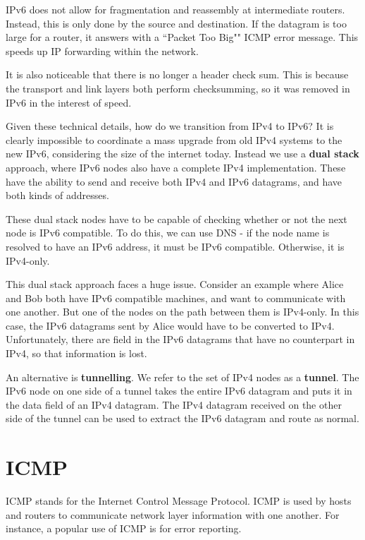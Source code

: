 \documentclass[12pt,letterpaper]{book}
\theoremstyle{definition}
\begin{document}
IPv6 does not allow for fragmentation and reassembly at intermediate routers. Instead, this is only done by the source and destination. If the datagram is too large for a router, it answers with a ``Packet Too Big"" ICMP error message. This speeds up IP forwarding within the network.

It is also noticeable that there is no longer a header check sum. This is because the transport and link layers both perform checksumming, so it was removed in IPv6 in the interest of speed.

Given these technical details, how do we transition from IPv4 to IPv6? It is clearly impossible to coordinate a mass upgrade from old IPv4 systems to the new IPv6, considering the size of the internet today. Instead we use a \textbf{dual stack} approach, where IPv6 nodes also have a complete IPv4 implementation. These have the ability to send and receive both IPv4 and IPv6 datagrams, and have both kinds of addresses. 

These dual stack nodes have to be capable of checking whether or not the next node is IPv6 compatible. To do this, we can use DNS - if the node name is resolved to have an IPv6 address, it must be IPv6 compatible. Otherwise, it is IPv4-only.

This dual stack approach faces a huge issue. Consider an example where Alice and Bob both have IPv6 compatible machines, and want to communicate with one another. But one of the nodes on the path between them is IPv4-only. In this case, the IPv6 datagrams sent by Alice would have to be converted to IPv4. Unfortunately, there are field in the IPv6 datagrams that have no counterpart in IPv4, so that information is lost.

An alternative is \textbf{tunnelling}. We refer to the set of IPv4 nodes as a \textbf{tunnel}. The IPv6 node on one side of a tunnel takes the entire IPv6 datagram and puts it in the data field of an IPv4 datagram. The IPv4 datagram received on the other side of the tunnel can be used to extract the IPv6 datagram and route as normal.

\section{ICMP}

ICMP stands for the Internet Control Message Protocol. ICMP is used by hosts and routers to communicate network layer information with one another. For instance, a popular use of ICMP is for error reporting.
\end{document}
